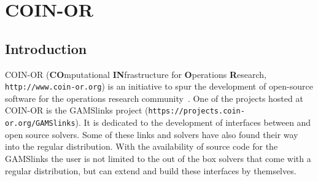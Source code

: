 \renewenvironment{option_tabular}%
{\begin{tabular}{p{.16\textwidth}p{.65\textwidth}p{.11\textwidth}}
\hline
\textbf{Option}      &
\textbf{Description} &
\textbf{Default}     \\
\hline}
{\end{tabular}}

\renewenvironment{tab_list}[1]%
{\begin{list}{}{\vspace*{-1.5ex}\renewcommand{\makelabel}{\desclabel}\parsep-0.15cm\labelwidth#1\leftmargin#1\setlength{\labelsep}{\itemindent}\topsep0cm\parskip0cm\partopsep0cm}}%
{\end{list}}

\newcommand{\BONMIN}{\textsc{Bonmin}\xspace}
\newcommand{\BONMINH}{\textsc{BonminH}\xspace}
\newcommand{\CBC}{\textsc{CBC}\xspace}
\newcommand{\COUENNE}{\textsc{Couenne}\xspace}
\newcommand{\IPOPT}{\textsc{Ipopt}\xspace}
\newcommand{\IPOPTH}{\textsc{IpoptH}\xspace}
\newcommand{\OS}{\textsc{OS}\xspace}
\newcommand{\OSI}{\textsc{OSI}\xspace}
\newcommand{\OSICPLEX}{\textsc{OsiCplex}\xspace}
\newcommand{\OSIGUROBI}{\textsc{OsiGurobi}\xspace}
\newcommand{\OSIMOSEK}{\textsc{OsiMosek}\xspace}
\newcommand{\OSISOPLEX}{\textsc{OsiSoplex}\xspace}
\newcommand{\OSIXPRESS}{\textsc{OsiXpress}\xspace}
\newcommand{\CPLEX}{\textsc{CPLEX}\xspace}
\newcommand{\GUROBI}{\textsc{GUROBI}\xspace}
\newcommand{\MOSEK}{\textsc{MOSEK}\xspace}
\newcommand{\SOPLEX}{\textsc{SoPlex}\xspace}
\newcommand{\XPRESS}{\textsc{XPRESS}\xspace}

\chapter{COIN-OR}

\minitoc

\section{Introduction}

COIN-OR (\textbf{CO}mputational \textbf{IN}frastructure for \textbf{O}perations \textbf{R}esearch, \texttt{http://www.coin-or.org}) is an initiative to spur the development of open-source software for the operations research community~\cite{Lo03}.
One of the projects hosted at COIN-OR is the GAMSlinks project (\texttt{https://projects.coin-or.org/GAMSlinks}).
It is dedicated to the development of interfaces between \GAMS and open source solvers.
Some of these links and solvers have also found their way into the regular \GAMS distribution.
With the availability of source code for the GAMSlinks the user is not limited to the out of the box solvers that come with a regular \GAMS distribution, but can extend and build these interfaces by themselves.

